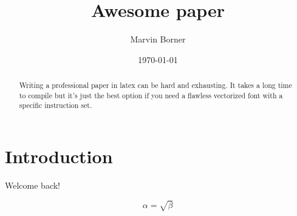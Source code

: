 \documentclass[a4paper]{article}
\begin{document}
\title{Awesome paper}
\author{Marvin Borner}
\date{\today}

\maketitle


\begin{abstract}
	Writing a professional paper in latex can be hard and exhausting. It takes a long time to compile but it's just the best option if you need a flawless vectorized font with a specific instruction set.
\end{abstract}

\section{Introduction}
Welcome back!

\begin{equation}
	\label{simple_equation}
	\alpha = \sqrt{\beta}
\end{equation}


\end{document}
